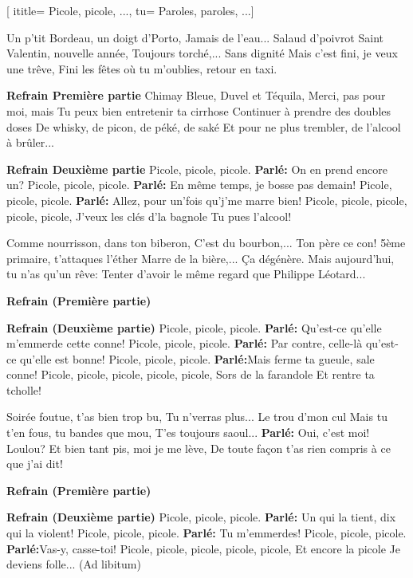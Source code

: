  [
ititle= {Picole, picole, ...},
tu= {Paroles, paroles, ...}]


\beginverse 
Un p'tit Bordeau, un doigt d'Porto,
Jamais de l'eau... Salaud d'poivrot
Saint Valentin, nouvelle année,
Toujours torché,... Sans dignité
Mais c'est fini, je veux une trêve,
Fini les fêtes où tu m'oublies, retour en taxi.
\endverse

\beginchorus
\textbf {Refrain {Première partie}}
Chimay Bleue, Duvel et Téquila,
Merci, pas pour moi, mais
Tu peux bien entretenir ta cirrhose
Continuer à prendre des doubles doses
De whisky, de picon, de péké, de saké
Et pour ne plus trembler, de l'alcool à brûler...
\endchorus

\beginchorus
\textbf {Refrain {Deuxième partie}}
Picole, picole, picole.
\textbf {Parlé:} On en prend encore un?
Picole, picole, picole.
\textbf {Parlé:} En même temps, je bosse pas demain!
Picole, picole, picole.
\textbf {Parlé:} Allez, pour un'fois qu'j'me marre bien!
Picole, picole, picole, picole, picole,
J'veux les clés d'la bagnole
Tu pues l'alcool!
\endchorus

\beginverse
Comme nourrisson, dans ton biberon,
C'est du bourbon,... Ton père ce con!
5ème primaire, t'attaques l'éther
Marre de la bière,... Ça dégénère.
Mais aujourd'hui, tu n'as qu'un rêve:
Tenter d'avoir le même regard que Philippe Léotard...
\endverse

\beginchorus
\textbf {Refrain (Première partie)}
\endchorus

\beginchorus
\textbf {Refrain (Deuxième partie)}
Picole, picole, picole.
\textbf {Parlé:} Qu'est-ce qu'elle m'emmerde cette conne!
Picole, picole, picole.
\textbf {Parlé:} Par contre, celle-là qu'est-ce qu'elle est bonne!
Picole, picole, picole.
\textbf {Parlé:}Mais ferme ta gueule, sale conne!
Picole, picole, picole, picole, picole,
Sors de la farandole
Et rentre ta tcholle!
\endchorus

\beginverse
Soirée foutue, t'as bien trop bu,
Tu n'verras plus... Le trou d'mon cul
Mais tu t'en fous, tu bandes que mou,
T'es toujours saoul... \textbf {Parlé:} Oui, c'est moi! Loulou?
Et bien tant pis, moi je me lève,
De toute façon t'as rien compris à ce que j'ai dit!
\endverse

\beginchorus
\textbf {Refrain (Première partie)}
\endchorus

\beginchorus
\textbf {Refrain (Deuxième partie)}
Picole, picole, picole.
\textbf {Parlé:} Un qui la tient, dix qui la violent!
Picole, picole, picole.
\textbf {Parlé:} Tu m'emmerdes!
Picole, picole, picole.
\textbf {Parlé:}Vas-y, casse-toi!
Picole, picole, picole, picole, picole,
Et encore la picole
Je deviens folle...
(Ad libitum)
\endchorus

\endsong